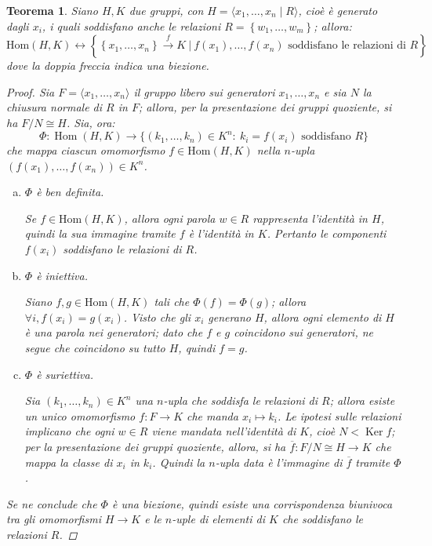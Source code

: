 \documentclass[12pt]{scrartcl}
\theoremstyle{style}
\newtheorem{teorema}{Teorema}[section]
\numberwithin{equation}{subsection}
\begin{document}
\begin{teorema}\label{mitoat}
	Siano $H, K$ due gruppi, con $H = \langle x_1,\ldots,x_n  \mid R \rangle$, cio\`e \`e generato dagli $x_i$, i quali soddisfano anche le relazioni $R=\left\{ w_1,\ldots,w_m \right\} $; allora:
	\[
		\mathrm{Hom} (H,K) \longleftrightarrow
			\left\{ \left\{ x_1,\ldots,x_n \right\} \stackrel{f}{\longrightarrow} K \ \Big\lvert\ f(x_1),\ldots,f(x_n)\text{ soddisfano le relazioni di } R \right\} 
	\] 
	dove la doppia freccia indica una biezione.
	\begin{proof}
Sia \(F=\langle x_1,\dots,x_n\rangle\) il gruppo libero sui generatori \(x_1,\dots,x_n\) e sia \(N\) la chiusura normale di \(R\) in \(F\); allora, per la presentazione dei gruppi quoziente, si ha $F / N \cong H$. 
Sia, ora:
\[
\Phi:\operatorname{Hom}(H,K)\longrightarrow \{(k_1,\dots,k_n)\in K^n:\ k_i=f(x_i)\text{ soddisfano }R\}
\]
che mappa ciascun omomorfismo $f \in \mathrm{Hom} (H,K)$ nella $n$-upla \((f(x_1),\dots,f(x_n)) \in K^n\).

\begin{enumerate}[(a).]
	\item $\Phi$ \`e ben definita.

Se $f \in \mathrm{Hom} (H,K)$, allora ogni parola \(w\in R\) rappresenta l'identità in \(H\), quindi la sua immagine tramite \(f\) è l'identità in \(K\). 
Pertanto le componenti \(f(x_i)\) soddisfano le relazioni di \(R\).

\item $\Phi$ \`e iniettiva.

Siano \(f,g \in \mathrm{Hom} (H,K)\) tali che \(\Phi(f)=\Phi(g)\); allora \(\forall i, f(x_i)=g(x_i)\).
Visto che gli \(x_i\) generano \(H\), allora ogni elemento di \(H\) è una parola nei generatori; dato che \(f\) e \(g\) coincidono sui generatori, ne segue che coincidono su tutto \(H\), quindi \(f=g\).

\item $\Phi$ \`e suriettiva.

Sia \((k_1,\dots,k_n)\in K^n\) una \(n\)-upla che soddisfa le relazioni di \(R\); allora esiste un unico omomorfismo $f : F \to K$ che manda \(x_i\longmapsto k_i\).
Le ipotesi sulle relazioni implicano che ogni \(w\in R\) viene mandata nell'identità di \(K\), cioè $N < \operatorname{Ker} f$; per la presentazione dei gruppi quoziente, allora, si ha $\overline{f}:F / N \cong H \longrightarrow K$ che mappa la classe di $x_i$ in $k_i$.
Quindi la $n$-upla data è l'immagine di $\overline{f}$ tramite \(\Phi\).
\end{enumerate}
Se ne conclude che \(\Phi\) è una biezione, quindi esiste una corrispondenza biunivoca tra gli omomorfismi \(H\to K\) e le \(n\)-uple di elementi di \(K\) che soddisfano le relazioni \(R\). 
\end{proof}
\end{teorema}
\end{document}
